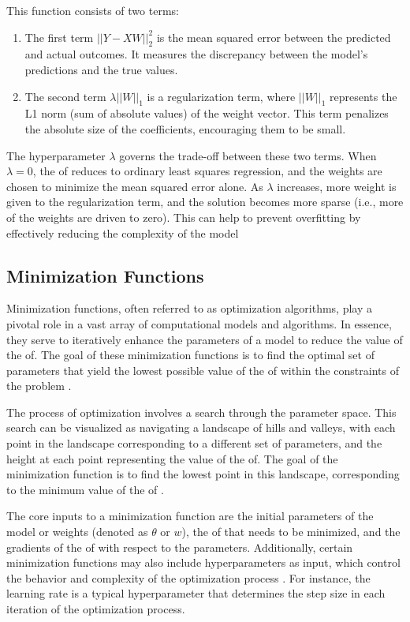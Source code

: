 \documentclass[
  a4paper,  %
  twoside,  %
  bibliography=totoc,
  headsepline,
  cleardoublepage=empty,
  parskip=half,
  draft=false
]{scrbook}
\begin{document}
This function consists of two terms:
\begin{enumerate}
  \item The first term \(||Y - XW||^2_2\) is the mean squared error between the predicted and actual outcomes.
  It measures the discrepancy between the model's predictions and the true values.
  \item The second term \(\lambda ||W||_1\) is a regularization term, where \(||W||_1\) represents the L1 norm (sum of absolute values) of the weight vector.
  This term penalizes the absolute size of the coefficients, encouraging them to be small.
\end{enumerate}
The hyperparameter \(\lambda\) governs the trade-off between these two terms.
When \(\lambda = 0\), the \gls{of} reduces to ordinary least squares regression, and the weights are chosen to minimize the mean squared error alone.
As \(\lambda\) increases, more weight is given to the regularization term, and the solution becomes more sparse (i.e., more of the weights are driven to zero).
This can help to prevent overfitting by effectively reducing the complexity of the model \cite{ShalevShwartz2014}

\subsection{Minimization Functions}
\label{subsec:minimizationFunctions}
Minimization functions, often referred to as optimization algorithms, play a pivotal role in a vast array of computational models and algorithms.
In essence, they serve to iteratively enhance the parameters of a model to reduce the value of the \gls{of}.
The goal of these minimization functions is to find the optimal set of parameters that yield the lowest possible value of the \gls{of} within the constraints of the problem \cite{Nocedal2006}.

The process of optimization involves a search through the parameter space.
This search can be visualized as navigating a landscape of hills and valleys, with each point in the landscape corresponding to a different set of parameters, and the height at each point representing the value of the \gls{of}.
The goal of the minimization function is to find the lowest point in this landscape, corresponding to the minimum value of the \gls{of} \cite{Goodfellow2017}.

The core inputs to a minimization function are the initial parameters of the model or weights (denoted as \(\theta\) or \(w\)),
the \gls{of} that needs to be minimized, and the gradients of the \gls{of} with respect to the parameters.
Additionally, certain minimization functions may also include hyperparameters as input, which control the behavior and complexity of the optimization process \cite{Virtanen2020}.
For instance, the learning rate is a typical hyperparameter that determines the step size in each iteration of the optimization process.
\end{document}
